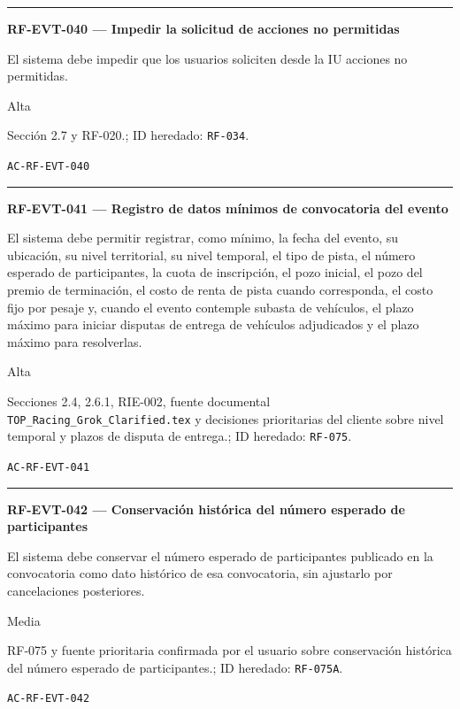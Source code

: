 \documentclass[10pt,letterpaper]{article}
\begin{document}
\vspace{0.25em}\hrule\vspace{0.65em}
\noindent\textbf{RF-EVT-040 --- Impedir la solicitud de acciones no permitidas}\par
\begin{description}[style=nextline,leftmargin=3.15cm,labelwidth=2.8cm,font=\normalfont\bfseries]
\item[Obligación] El sistema debe impedir que los usuarios soliciten desde la IU acciones no permitidas.
\item[Prioridad] Alta
\item[Procedencia] Sección 2.7 y RF-020.; ID heredado: \texttt{RF-034}.
\item[Verificación] \texttt{AC-RF-EVT-040}
\end{description}
\vspace{0.25em}\hrule\vspace{0.65em}
\noindent\textbf{RF-EVT-041 --- Registro de datos mínimos de convocatoria del evento}\par
\begin{description}[style=nextline,leftmargin=3.15cm,labelwidth=2.8cm,font=\normalfont\bfseries]
\item[Obligación] El sistema debe permitir registrar, como mínimo, la fecha del evento, su ubicación, su nivel territorial, su nivel temporal, el tipo de pista, el número esperado de participantes, la cuota de inscripción, el pozo inicial, el pozo del premio de terminación, el costo de renta de pista cuando corresponda, el costo fijo por pesaje y, cuando el evento contemple subasta de vehículos, el plazo máximo para iniciar disputas de entrega de vehículos adjudicados y el plazo máximo para resolverlas.
\item[Prioridad] Alta
\item[Procedencia] Secciones 2.4, 2.6.1, RIE-002, fuente documental \texttt{TOP\_Racing\_Grok\_Clarified.tex} y decisiones prioritarias del cliente sobre nivel temporal y plazos de disputa de entrega.; ID heredado: \texttt{RF-075}.
\item[Verificación] \texttt{AC-RF-EVT-041}
\end{description}
\vspace{0.25em}\hrule\vspace{0.65em}
\noindent\textbf{RF-EVT-042 --- Conservación histórica del número esperado de participantes}\par
\begin{description}[style=nextline,leftmargin=3.15cm,labelwidth=2.8cm,font=\normalfont\bfseries]
\item[Obligación] El sistema debe conservar el número esperado de participantes publicado en la convocatoria como dato histórico de esa convocatoria, sin ajustarlo por cancelaciones posteriores.
\item[Prioridad] Media
\item[Procedencia] RF-075 y fuente prioritaria confirmada por el usuario sobre conservación histórica del número esperado de participantes.; ID heredado: \texttt{RF-075A}.
\item[Verificación] \texttt{AC-RF-EVT-042}
\end{description}
\end{document}
